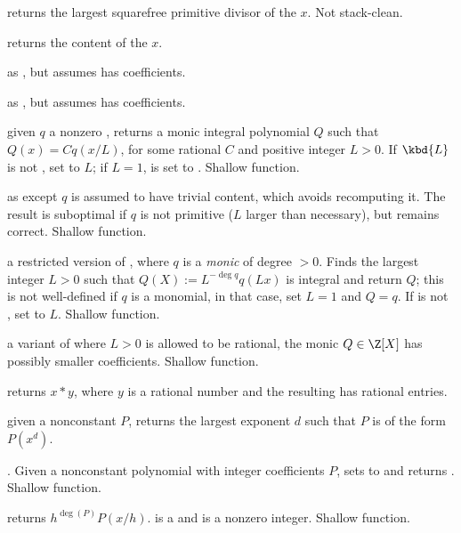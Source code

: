  returns the largest squarefree primitive divisor
of the  $x$. Not stack-clean.

 returns the content of the  $x$.

 as , but assumes  has 
coefficients.

 as , but assumes
 has  coefficients.

 given $q$ a nonzero ,
returns a monic integral polynomial $Q$ such that $Q(x) = C q(x/L)$, for some
rational $C$ and positive integer $L > 0$. If $\kbd{L}$ is not ,
set  to $L$; if $L = 1$,  is set to . Shallow
function.

 as  except
$q$ is assumed to have trivial content, which avoids recomputing it.
The result is suboptimal if $q$ is not primitive ($L$ larger than
necessary), but remains correct. Shallow function.

 a restricted version of
, where $q$ is a \emph{monic} 
of degree $> 0$. Finds the largest integer $L > 0$ such that
$Q(X) := L^{-\deg q} q(Lx)$ is integral and return $Q$; this is not
well-defined if $q$ is a monomial, in that case, set $L=1$ and $Q = q$. If
 is not , set  to $L$. Shallow function.

 a variant of 
where $L > 0$ is allowed to be rational, the monic $Q\in \Z[X]$ has possibly
smaller coefficients. Shallow function.

 returns $x*y$, where $y$ is a rational number
and the resulting  has rational entries.

 given a nonconstant 
$P$, returns the largest exponent $d$ such that $P$ is of the form $P(x^d)$.

. Given a nonconstant
polynomial with integer coefficients $P$, sets  to
 and returns . Shallow
function.

 returns $h^{\deg(P)} P(x/h)$.
 is a  and  is a nonzero integer. Shallow function.

